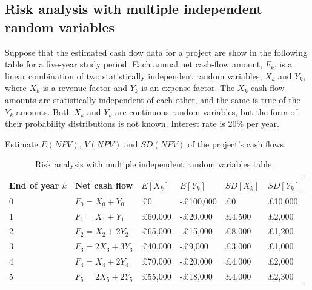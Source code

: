 \subsection{Risk analysis with multiple independent random variables}
Suppose that the estimated cash flow data for a project are show in the following table for a five-year study period. Each annual net cash-flow amount, $F_k$, is a linear combination of two statistically independent random variables, $X_k$ and $Y_k$, where $X_k$ is a revenue factor and $Y_k$ is an expense factor. The $X_k$ cash-flow amounts are statistically independent of each other, and the same is true of the $Y_k$ amounts. Both $X_k$ and $Y_k$ are continuous random variables, but the form of their probability distributions is not known. Interest rate is 20\% per year.
\begin{quoting}
    Estimate $E\left(NPV\right)$, $V\left(NPV\right)$ and $SD\left(NPV\right)$ of the project's cash flows.
\end{quoting}
\begin{table}[H]
    \centering
    \begin{tabular}{@{}llllll@{}}
        \toprule
        \textbf{End of year} $k$ & \textbf{Net cash flow} & $E\left[X_k\right]$ & $E\left[Y_k\right]$ & $SD\left[X_k\right]$ & $SD\left[Y_k\right]$ \\
        \midrule
        0                        & $F_0 = X_0 + Y_0$      & \pounds 0           & -\pounds 100,000    & \pounds 0            & \pounds 10,000       \\
        1                        & $F_1 = X_1 + Y_1$      & \pounds 60,000      & -\pounds 20,000     & \pounds 4,500        & \pounds 2,000        \\
        2                        & $F_2 = X_2 + 2Y_2$     & \pounds 65,000      & -\pounds 15,000     & \pounds 8,000        & \pounds 1,200        \\
        3                        & $F_3 = 2X_3 + 3Y_3$    & \pounds 40,000      & -\pounds 9,000      & \pounds 3,000        & \pounds 1,000        \\
        4                        & $F_4 = X_4 + 2Y_4$     & \pounds 70,000      & -\pounds 20,000     & \pounds 4,000        & \pounds 2,000        \\
        5                        & $F_5 = 2X_5 + 2Y_5$    & \pounds 55,000      & -\pounds 18,000     & \pounds 4,000        & \pounds 2,300        \\
        \bottomrule
    \end{tabular}
    \caption{Risk analysis with multiple independent random variables table.}
\end{table}
